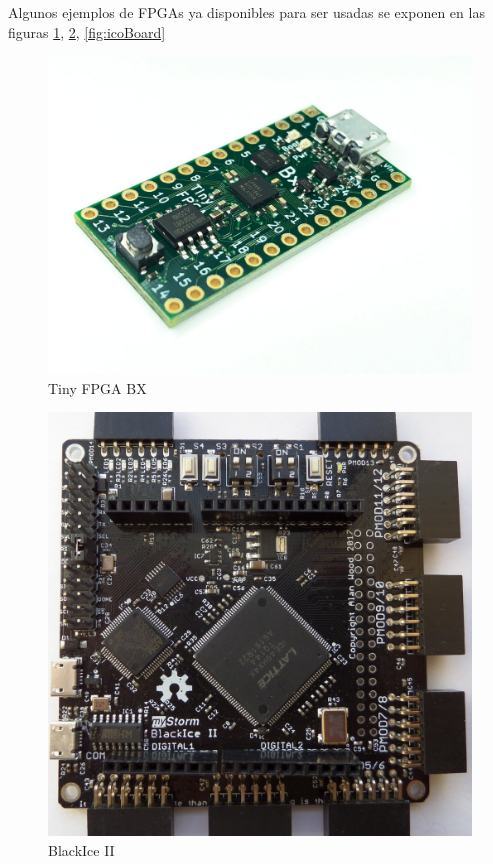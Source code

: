 Algunos ejemplos de FPGAs ya disponibles para ser usadas se exponen en las figuras \ref{fig:tiny_fpga}, \ref{fig:blackIceII}, \ref{fig:icoBoard}
\begin{center}
	\begin{figure}[H]
		\center
		\includegraphics[trim = 0mm 0mm 0mm 0mm, clip,scale=0.2]{imagenes/EstadoArte/tinyFPGABX.jpg}
		\caption{Tiny FPGA BX}
		\label{fig:tiny_fpga}
	\end{figure}
\end{center}
\begin{center}
	\begin{figure}[H]
		\center
		\includegraphics[trim = 0mm 0mm 0mm 0mm, clip,scale=0.2]{imagenes/EstadoArte/BlackIce.jpg}
		\caption{BlackIce II}
		\label{fig:blackIceII}
	\end{figure}
\end{center}
